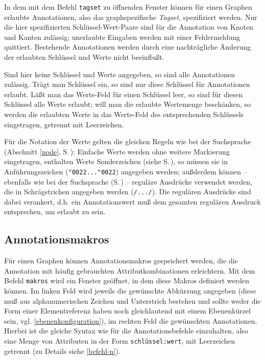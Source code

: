 \documentclass[12pt]{scrartcl}
\newcommand{\quo}{\char"0022}
\begin{document}
In dem mit dem Befehl \texttt{tagset} zu öffnenden Fenster können für einen Graphen erlaubte Annotationen, also das graphspezifische \textit{Tagset}, spezifiziert werden. Nur die hier spezifizierten Schlüssel-Wert-Paare sind für die Annotation von Knoten und Kanten zulässig; unerlaubte Eingaben werden mit einer Fehlermeldung quittiert. Bestehende Annotationen werden durch eine nachträgliche Änderung der erlaubten Schlüssel und Werte nicht beeinflußt.

Sind hier keine Schlüssel und Werte angegeben, so sind alle Annotationen zulässig. Trägt man Schlüssel ein, so sind nur diese Schlüssel für Annotationen erlaubt. Läßt man das Werte-Feld für einen Schlüssel leer, so sind für diesen Schlüssel alle Werte erlaubt; will man die erlaubte Wertemenge beschänken, so werden die erlaubten Werte in das Werte-Feld des entsprechenden Schlüssels eingetragen, getrennt mit Leerzeichen.

Für die Notation der Werte gelten die gleichen Regeln wie bei der Suchsprache (Abschnitt \ref{node}, S.\,\pageref{zeichenketten}): Einfache Werte werden ohne weitere Markierung eingetragen, enthalten Werte Sonderzeichen (siehe S.\,\pageref{zeichenketten}), so müssen sie in Anführungszeichen (\texttt{\quo...\quo}) angegeben werden; außderdem können – ebenfalls wie bei der Suchsprache (S.\,\pageref{zeichenketten}) – reguläre Ausdrücke verwendet werden, die in Schrägstrichen angegeben werden (\texttt{/.../}). Die regulären Ausdrücke sind dabei verankert, d.h. ein Annotationswert muß dem gesamten regulären Ausdruck entsprechen, um erlaubt zu sein.

\subsection{Annotationsmakros}\label{annotationsmakros}

Für einen Graphen können Annotationsmakros gespeichert werden, die die Annotation mit häufig gebrauchten Attributkombinationen erleichtern. Mit dem Befehl \texttt{makros} wird ein Fenster geöffnet, in dem diese Makros definiert werden können. Im linken Feld wird jeweils die gewünschte Abkürzung angegeben (diese muß aus alphanumerischen Zeichen und Unterstrich bestehen und sollte weder die Form einer Elementreferenz haben noch gleichlautend mit einem Ebenenkürzel sein, vgl. \ref{ebenenkonfiguration}), im rechten Feld die gewünschten Annotationen. Hierbei ist die gleiche Syntax wie für die Annotationsbefehle einzuhalten, also eine Menge von Attributen in der Form \texttt{schlüssel:wert}, mit Leerzeichen getrennt (zu Details siehe \ref{befehl-n}).
\end{document}
